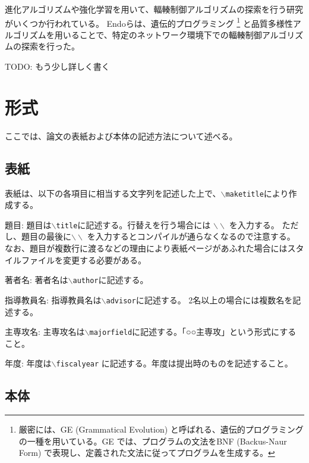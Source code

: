 \documentclass[a4paper,11pt]{jreport}
\begin{document}
進化アルゴリズムや強化学習を用いて、輻輳制御アルゴリズムの探索を行う研究がいくつか行われている。
Endoら\cite{endo-2022-toward}は、遺伝的プログラミング\cite{holland1992adaptation, gp, gp-foundation}
\footnote{厳密には、GE (Grammatical Evolution) \cite{grammatical-evolution}と呼ばれる、遺伝的プログラミングの一種を用いている。GE では、プログラムの文法をBNF (Backus-Naur Form) で表現し、定義された文法に従ってプログラムを生成する。}
と品質多様性アルゴリズム\cite{quality-diversity}を用いることで、特定のネットワーク環境下での輻輳制御アルゴリズムの探索を行った。

TODO: もう少し詳しく書く

\newpage

\chapter{形式}

ここでは、論文の表紙および本体の記述方法について述べる。

\section{表紙}

表紙は、以下の各項目に相当する文字列を記述した上で、\texttt{$\backslash$maketitle}により作成する。

\begin{description} \parskip=1pt
\item{題目: }
題目は\texttt{$\backslash$title}に記述する。行替えを行う場合には $\backslash \backslash$ を入力する。
ただし、題目の最後に$\backslash \backslash$ を入力するとコンパイルが通らなくなるので注意する。
なお、題目が複数行に渡るなどの理由により表紙ページがあふれた場合にはスタイルファイルを変更する必要がある。
\item{著者名: }
著者名は\texttt{$\backslash$author}に記述する。
\item{指導教員名: }
指導教員名は\texttt{$\backslash$advisor}に記述する。
2名以上の場合には複数名を記述する。
\item{主専攻名: }
主専攻名は\texttt{$\backslash$majorfield}に記述する。「○○主専攻」という形式にすること。
\item{年度: }
年度は\texttt{$\backslash$fiscalyear} に記述する。年度は提出時のものを記述すること。
\end{description}

\section{本体}
\end{document}
